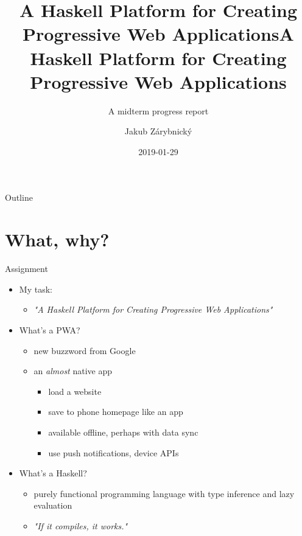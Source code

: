 \documentclass[presentation]{beamer}
\author{Jakub Zárybnický}
\date{2019-01-29}
\title{A Haskell Platform for Creating Progressive Web Applications}
\subtitle{A midterm progress report}
\title[PWAs in Haskell]{A Haskell Platform for Creating Progressive Web Applications}
\begin{document}
\maketitle
\begin{frame}{Outline}
\tableofcontents
\end{frame}


\section{What, why?}
\label{sec:org5ab6d18}
\begin{frame}[label={sec:org1b7f0af}]{Assignment}
\begin{itemize}
\item My task:
\begin{itemize}
\item \emph{"A Haskell Platform for Creating Progressive Web Applications"}
\end{itemize}
\end{itemize}

\pause

\begin{itemize}
\item What's a PWA?
\begin{itemize}
\item new buzzword from Google
\item an \emph{almost} native app
\begin{itemize}
\item load a website
\item save to phone homepage like an app
\item available offline, perhaps with data sync
\item use push notifications, device APIs
\end{itemize}
\end{itemize}
\end{itemize}

\pause

\begin{itemize}
\item What's a Haskell?
\begin{itemize}
\item purely functional programming language with type inference and lazy evaluation
\item \emph{"If it compiles, it works."}
\end{itemize}
\end{itemize}
\end{frame}
\end{document}
